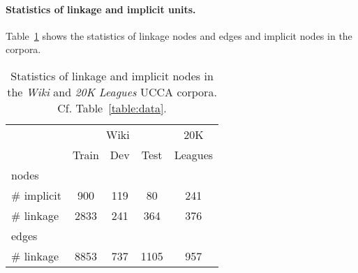 \documentclass[11pt,a4paper]{article}
\newcommand{\tabref}[1]{Table~\ref{#1}}
\begin{document}
\paragraph{Statistics of linkage and implicit units.}

\tabref{table:data_linkage_implicit} shows the statistics of linkage nodes and edges and implicit nodes
in the corpora.

\begin{table}[ht]
\centering
\begin{tabular}{l|ccc|c}
& \multicolumn{3}{c|}{Wiki} & 20K \\
& \small Train & \small Dev & \small Test & Leagues \\
\hline
nodes \\
\# implicit & 900 & 119 & 80 & 241 \\
\# linkage & 2833 & 241 & 364 & 376 \\
\hline
edges \\
\# linkage & 8853 & 737 & 1105 & 957
\end{tabular}
\caption{Statistics of linkage and implicit nodes in the
\textit{Wiki} and \textit{20K Leagues} UCCA corpora.
Cf. \tabref{table:data}.
}
\label{table:data_linkage_implicit}
\end{table}
\end{document}
